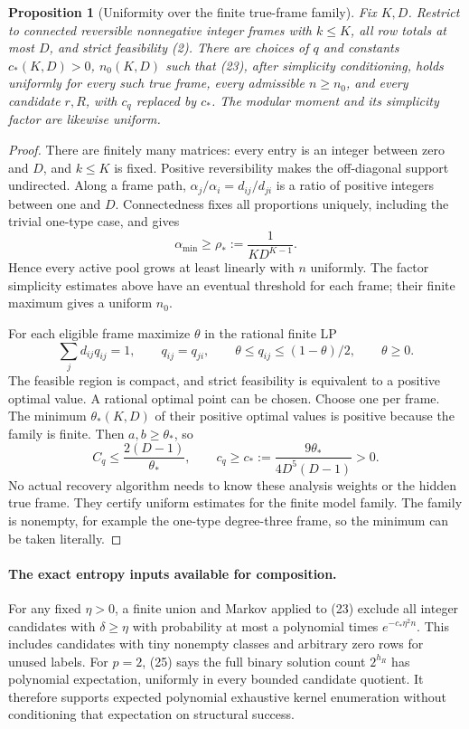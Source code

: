 \documentclass[11pt]{article}
\newtheorem{proposition}{Proposition}
\begin{document}
\begin{proposition}[Uniformity over the finite true-frame family]
Fix $K,D$. Restrict to connected reversible nonnegative integer
frames with $k\leq K$, all row totals at most $D$, and strict
feasibility (2). There are choices of $q$ and constants
$c_*(K,D)>0$, $n_0(K,D)$ such that (23), after simplicity conditioning,
holds uniformly for every such true frame, every admissible
$n\geq n_0$, and every candidate $r,R$, with $c_q$ replaced by $c_*$.
The modular moment and its simplicity factor are likewise uniform.
\end{proposition}
\begin{proof}
There are finitely many matrices: every entry is an integer between
zero and $D$, and $k\leq K$ is fixed. Positive reversibility makes
the off-diagonal support undirected. Along a frame path,
$\alpha_j/\alpha_i=d_{ij}/d_{ji}$ is a ratio of positive integers
between one and $D$. Connectedness fixes all proportions uniquely,
including the trivial one-type case, and gives
\[
 \alpha_{\min}\geq\rho_*:=\frac1{KD^{K-1}}.        \tag{27}
\]
Hence every active pool grows at least linearly with $n$ uniformly.
The factor simplicity estimates above have an eventual threshold for
each frame; their finite maximum gives a uniform $n_0$.

For each eligible frame maximize $\theta$ in the rational finite LP
\[
 \sum_jd_{ij}q_{ij}=1,\qquad q_{ij}=q_{ji},\qquad
 \theta\leq q_{ij}\leq(1-\theta)/2,
 \qquad\theta\geq0.                              \tag{28}
\]
The feasible region is compact, and strict feasibility is equivalent
to a positive optimal value. A rational optimal point can be chosen.
Choose one per frame. The minimum $\theta_*(K,D)$ of their positive
optimal values is positive because the family is finite. Then
$a,b\geq\theta_*$, so
\[
 C_q\leq\frac{2(D-1)}{\theta_*},\qquad
 c_q\geq c_*:=\frac{9\theta_*}{4D^5(D-1)}>0.        \tag{29}
\]
No actual recovery algorithm needs to know these analysis weights or
the hidden true frame. They certify uniform estimates for the finite
model family. The family is nonempty, for example the one-type
degree-three frame, so the minimum can be taken literally.
\end{proof}

\paragraph{The exact entropy inputs available for composition.}
For any fixed $\eta>0$, a finite union and Markov applied to (23)
exclude all integer candidates with $\delta\geq\eta$ with probability
at most a polynomial times $e^{-c_*\eta^2n}$. This includes candidates
with tiny nonempty classes and arbitrary zero rows for unused labels.
For $p=2$, (25) says the full binary solution count $2^{h_R}$ has
polynomial expectation, uniformly in every bounded candidate quotient.
It therefore supports expected polynomial exhaustive kernel enumeration
without conditioning that expectation on structural success.
\end{document}
